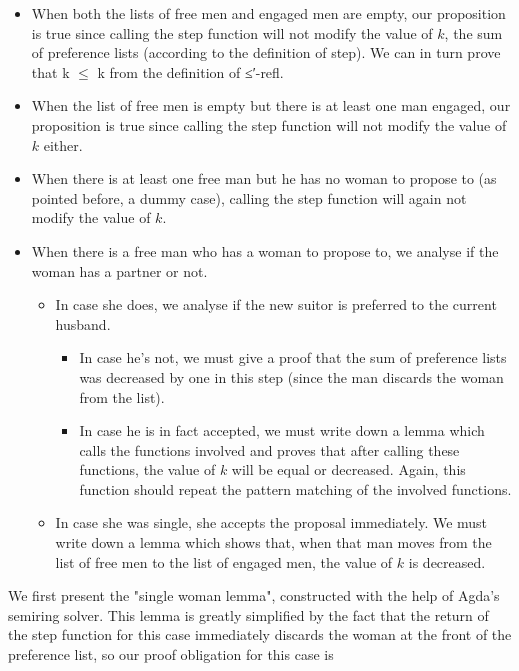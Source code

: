 {\begin{itemize}
  \item When both the lists of free men and engaged men are empty, our proposition is true since calling the step function will not modify the value of $k$, the sum of preference lists (according to the definition of step). We can in turn prove that k $\le$ k from the definition of ≤′-refl.
  \item When the list of free men is empty but there is at least one man engaged, our proposition is true since calling the step function will not modify the value of $k$ either.
  \item When there is at least one free man but he has no woman to propose to (as pointed before, a dummy case), calling the step function will again not modify the value of $k$.
  \item When there is a free man who has a woman to propose to, we analyse if the woman has a partner or not.
    \begin{itemize}
      \item In case she does, we analyse if the new suitor is preferred to the current husband.
        \begin{itemize}
          \item In case he's not, we must give a proof that the sum of preference lists was decreased by one in this step (since the man discards the woman from the list).
          \item In case he is in fact accepted, we must write down a lemma which calls the functions involved and proves that after calling these functions, the value of $k$ will be equal or decreased. Again, this function should repeat the pattern matching of the involved functions.
        \end{itemize}
      \item In case she was single, she accepts the proposal immediately. We must write down a lemma which shows that, when that man moves from the list of free men to the list of engaged men, the value of $k$ is decreased.
    \end{itemize}
\end{itemize}

We first present the "single woman lemma", constructed with the help of Agda's semiring solver. This lemma is greatly simplified by the fact that the return of the step function for this case immediately discards the woman at the front of the preference list, so our proof obligation for this case is

}
